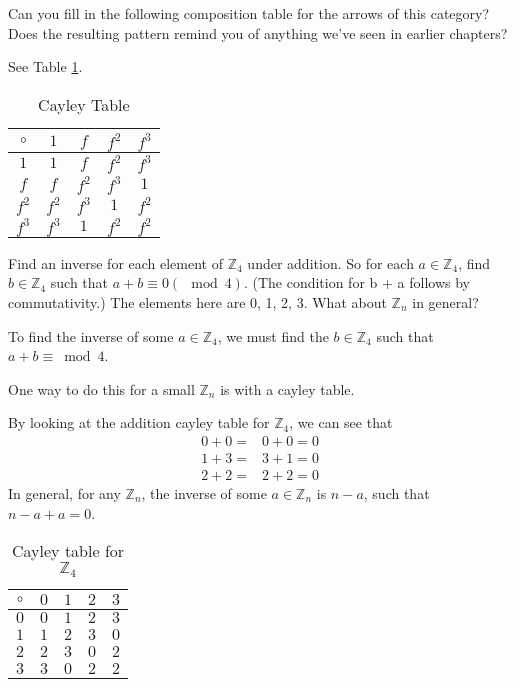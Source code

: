 \begin{ttta}
	Can you fill in the following composition table for the arrows of this category?
	Does the resulting pattern remind you of anything we’ve seen in earlier
	chapters?

	See Table \ref{tbl:cayley}.
	\begin{table}
		\centering
		\begin{tabular}{c|cccc}
			$\circ$ & $1$   & $f$   & $f^2$ & $f^3$ \\
			\hline
			$1$     & $1$   & $f$   & $f^2$ & $f^3$ \\
			$f$     & $f$   & $f^2$ & $f^3$ & $1$   \\
			$f^2$   & $f^2$ & $f^3$ & $1$   & $f^2$ \\
			$f^3$   & $f^3$ & $1$   & $f^2$ & $f^2$ \\
		\end{tabular}
		\caption{Cayley Table}
		\label{tbl:cayley}
	\end{table}
\end{ttta}
\begin{ttta}
	Find an inverse for each element of $\mathbb{Z}_4$ under addition. So for each $a \in
		\mathbb{Z}_4$, find $b \in \mathbb{Z}_4$ such that $a + b \equiv 0 (\mod 4)$.
	(The condition for b + a follows by commutativity.) The elements here are 0, 1,
	2, 3. What about $\mathbb{Z}_n$ in general?
\end{ttta}
\begin{proofitem}
	\item To find the inverse of some $a\in\mathbb{Z}_4$, we must find the
	$b\in\mathbb{Z}_4$ such that $a+b\equiv\bmod 4$.
	\item One way to do this for a small $\mathbb{Z}_n$ is with a cayley table.
	\item By looking at the addition cayley table for $\mathbb{Z}_4$, we can see that
	\setcounter{equation}{0}
	\begin{align}
		0+0= & 0+0=0 \\
		1+3= & 3+1=0 \\
		2+2= & 2+2=0
	\end{align}
	In general, for any $\mathbb{Z}_n$, the inverse of some $a\in\mathbb{Z}_n$
	is $n-a$, such that $n-a+a=0$.
	\begin{table}
		\centering
		\begin{tabular}{c|cccc}
			$\circ$ & $0$ & $1$ & $2$ & $3$ \\
			\hline
			$0$     & $0$ & $1$ & $2$ & $3$ \\
			$1$     & $1$ & $2$ & $3$ & $0$ \\
			$2$     & $2$ & $3$ & $0$ & $2$ \\
			$3$     & $3$ & $0$ & $2$ & $2$ \\
		\end{tabular}
		\caption{Cayley table for $\mathbb{Z}_4$}
	\end{table}
\end{proofitem}

